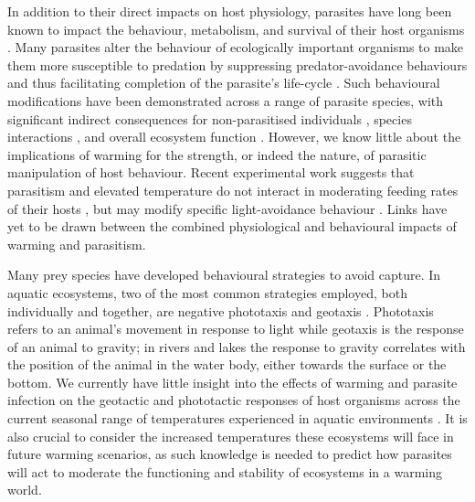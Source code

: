 In addition to their direct impacts on host physiology, parasites have long been known to impact the behaviour, metabolism, and survival of their host organisms \citep{burnett1949, kaldonski2009, perrot2012, poulin2013, perrot2014}. Many parasites alter the behaviour of ecologically important organisms to make them more susceptible to predation by suppressing predator-avoidance behaviours and thus facilitating completion of the parasite’s life-cycle \citep{dick2010, hatcher2014, toscano2014}. Such behavioural modifications have been demonstrated across a range of parasite species, with significant indirect consequences for non-parasitised individuals \citep{kadoya2015, demandt2018}, species interactions \citep{reisinger2015}, and overall ecosystem function \citep{sato2012}. However, we know little about the implications of warming for the strength, or indeed the nature, of parasitic manipulation of host behaviour. Recent experimental work suggests that parasitism and elevated temperature do not interact in moderating feeding rates of their hosts \citep{labaude2016}, but may modify specific light-avoidance behaviour \citep{labaude2017}. Links have yet to be drawn between the combined physiological and behavioural impacts of warming and parasitism. 

Many prey species have developed behavioural strategies to avoid capture. In aquatic ecosystems, two of the most common strategies employed, both individually and together, are negative phototaxis and geotaxis \citep{marriott1989, bauer2005}.  Phototaxis refers to an animal’s movement in response to light while geotaxis is the response of an animal to gravity; in rivers and lakes the response to gravity correlates with the position of the animal in the water body, either towards the surface or the bottom. We currently have little insight into the effects of warming and parasite infection on the geotactic and phototactic responses of host organisms across the current seasonal range of temperatures experienced in aquatic environments \citep{kaldonski2007, jacquin2014}. It is also crucial to consider the increased temperatures these ecosystems will face in future warming scenarios, as such knowledge is needed to predict how parasites will act to moderate the functioning and stability of ecosystems in a warming world.

